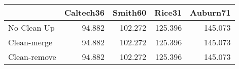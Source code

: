 \begin{tabular}{lrrrr}
\toprule
{} & Caltech36 & Smith60 &  Rice31 & Auburn71 \\
\midrule
No Clean Up  &    94.882 & 102.272 & 125.396 &  145.073 \\
Clean-merge  &    94.882 & 102.272 & 125.396 &  145.073 \\
Clean-remove &    94.882 & 102.272 & 125.396 &  145.073 \\
\bottomrule
\end{tabular}
